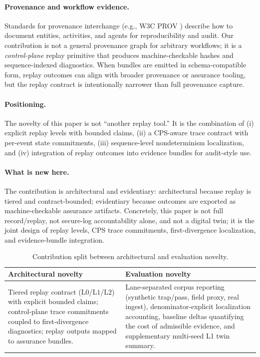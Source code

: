\documentclass[11pt]{article}
\newcommand{\Lzero}{\ensuremath{\mathrm{L0}}}
\newcommand{\Lone}{\ensuremath{\mathrm{L1}}}
\newcommand{\Ltwo}{\ensuremath{\mathrm{L2}}}
\begin{document}
\paragraph{Provenance and workflow evidence.}
Standards for provenance interchange (e.g., W3C PROV \cite{w3c2013prov}) describe how to document entities, activities, and agents for reproducibility and audit. Our contribution is not a general provenance graph for arbitrary workflows; it is a \emph{control-plane} replay primitive that produces machine-checkable hashes and sequence-indexed diagnostics. When bundles are emitted in schema-compatible form, replay outcomes can align with broader provenance or assurance tooling, but the replay contract is intentionally narrower than full provenance capture.

\paragraph{Positioning.}
The novelty of this paper is not ``another replay tool.'' It is the combination of (i) explicit replay levels with bounded claims, (ii) a CPS-aware trace contract with per-event state commitments, (iii) sequence-level nondeterminism localization, and (iv) integration of replay outcomes into evidence bundles for audit-style use.

\paragraph{What is new here.}
The contribution is architectural and evidentiary: architectural because replay is tiered and contract-bounded; evidentiary because outcomes are exported as machine-checkable assurance artifacts. Concretely, this paper is not full record/replay, not secure-log accountability alone, and not a digital twin; it is the joint design of replay levels, CPS trace commitments, first-divergence localization, and evidence-bundle integration.

\begin{table}[H]
\centering
\caption{Contribution split between architectural and evaluation novelty.}
\label{tab:novelty-split}
\begin{tabular}{p{5.8cm}p{8.4cm}}
\toprule
Architectural novelty & Evaluation novelty \\
\midrule
Tiered replay contract (\Lzero/\Lone/\Ltwo) with explicit bounded claims; control-plane trace commitments coupled to first-divergence diagnostics; replay outputs mapped to assurance bundles. & Lane-separated corpus reporting (synthetic trap/pass, field proxy, real ingest), denominator-explicit localization accounting, baseline deltas quantifying the cost of admissible evidence, and supplementary multi-seed L1 twin summary. \\
\bottomrule
\end{tabular}
\end{table}
\end{document}

